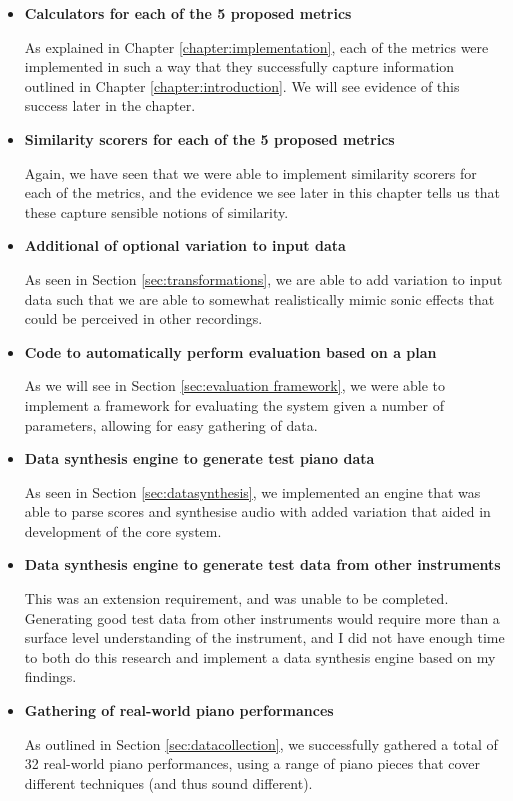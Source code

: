 \documentclass[oneside, class=book, 12pt, crop=false]{standalone}
\begin{document}
\begin{itemize}
  \item
    \textbf{Calculators for each of the 5 proposed metrics}

    As explained in Chapter \ref{chapter:implementation}, each of the metrics were implemented in such a way that they successfully capture information outlined in Chapter \ref{chapter:introduction}. We will see evidence of this success later in the chapter.

  \item
    \textbf{Similarity scorers for each of the 5 proposed metrics}

    Again, we have seen that we were able to implement similarity scorers for each of the metrics, and the evidence we see later in this chapter tells us that these capture sensible notions of similarity.

  \item
    \textbf{Additional of optional variation to input data}

    As seen in Section \ref{sec:transformations}, we are able to add variation to input data such that we are able to somewhat realistically mimic sonic effects that could be perceived in other recordings.

  \item
    \textbf{Code to automatically perform evaluation based on a plan}

    As we will see in Section \ref{sec:evaluation framework}, we were able to implement a framework for evaluating the system given a number of parameters, allowing for easy gathering of data.

  \item
    \textbf{Data synthesis engine to generate test piano data}

    As seen in Section \ref{sec:datasynthesis}, we implemented an engine that was able to parse scores and synthesise audio with added variation that aided in development of the core system.

  \item
    \textbf{Data synthesis engine to generate test data from other instruments}

    This was an extension requirement, and was unable to be completed. Generating good test data from other instruments would require more than a surface level understanding of the instrument, and I did not have enough time to both do this research and implement a data synthesis engine based on my findings.

  \item
    \textbf{Gathering of real-world piano performances}

    As outlined in Section \ref{sec:datacollection}, we successfully gathered a total of 32  real-world piano performances, using a range of piano pieces that cover different techniques (and thus sound different).
\end{itemize}
\end{document}
